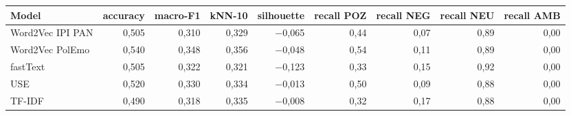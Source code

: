 \begin{tabular}{lrrrrrrrr}
\toprule
Model & accuracy & macro-F1 & kNN-10 & silhouette & recall POZ & recall NEG & recall NEU & recall AMB \\
\midrule
Word2Vec IPI PAN & 0{,}505 & 0{,}310 & 0{,}329 & $-$0{,}065 & 0{,}44 & 0{,}07 & 0{,}89 & 0{,}00 \\
Word2Vec PolEmo & 0{,}540 & 0{,}348 & 0{,}356 & $-$0{,}048 & 0{,}54 & 0{,}11 & 0{,}89 & 0{,}00 \\
\midrule
fastText & 0{,}505 & 0{,}322 & 0{,}321 & $-$0{,}123 & 0{,}33 & 0{,}15 & 0{,}92 & 0{,}00 \\
USE & 0{,}520 & 0{,}330 & 0{,}334 & $-$0{,}013 & 0{,}50 & 0{,}09 & 0{,}88 & 0{,}00 \\
TF-IDF & 0{,}490 & 0{,}318 & 0{,}335 & $-$0{,}008 & 0{,}32 & 0{,}17 & 0{,}88 & 0{,}00 \\
\bottomrule
\end{tabular}
